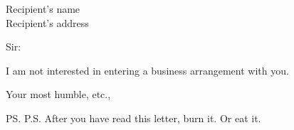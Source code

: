 \documentclass{letter}
\begin{document}
\begin{letter}{Recipient's name \\ Recipient's address}
	\opening{Sir:}
	I am not interested in entering a business arrangement with you.
	\closing{Your most humble, etc.,}
	\ps{P.S. After you have read this letter, burn it. Or eat it.}
\end{letter}
\end{document}
